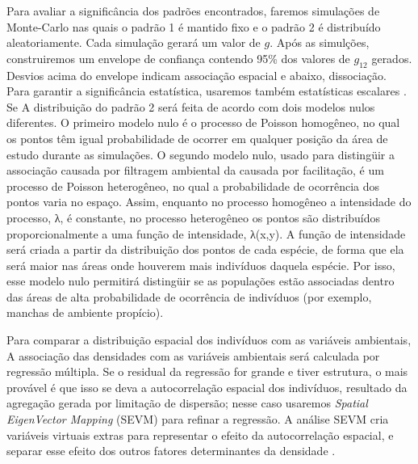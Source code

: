 \documentclass[twoside,12pt,a4paper]{report}
\begin{document}
Para avaliar a significância dos padrões encontrados, faremos simulações de Monte-Carlo nas
quais o padrão 1 é mantido fixo e o padrão 2 é distribuído aleatoriamente. 
Cada simulação gerará um valor de $g$. Após as simulções, construiremos um envelope de confiança contendo 95\% dos valores de
$g_{12}$ gerados. Desvios acima do envelope indicam associação espacial e abaixo,
dissociação. Para garantir a significância estatística, usaremos também estatísticas escalares
\citep{DiggleBook}. Se 
A distribuição do
padrão 2 será feita de acordo com dois modelos nulos diferentes. O primeiro modelo nulo é o
processo de Poisson homogêneo, no qual os pontos têm igual probabilidade de ocorrer em
qualquer posição da área de estudo durante as simulações. O segundo modelo nulo, usado para
distingüir a associação causada por filtragem ambiental da causada por facilitação, é um
processo de Poisson heterogêneo, no qual a probabilidade de ocorrência dos pontos varia no
espaço. Assim, enquanto no processo homogêneo a intensidade do processo, λ, é constante, no
processo heterogêneo os pontos são distribuídos proporcionalmente a uma função de
intensidade, λ(x,y). A função de intensidade será criada a partir da distribuição dos pontos
de cada espécie, de forma que ela será maior nas áreas onde houverem mais indivíduos daquela
espécie. Por isso, esse modelo nulo permitirá distingüir se as populações estão associadas
dentro das áreas de alta probabilidade de ocorrência de indivíduos (por exemplo, manchas de
ambiente propício).

Para comparar a distribuição espacial dos indivíduos com as variáveis ambientais, 
A associação das densidades com as variáveis ambientais será calculada por regressão
múltipla. Se o residual da regressão for grande e tiver estrutura, o mais provável é que isso
se deva a autocorrelação espacial dos indivíduos, resultado da agregação gerada por limitação
de dispersão; nesse caso usaremos {\em Spatial
EigenVector Mapping} (SEVM) para refinar a regressão. A análise SEVM cria variáveis virtuais
extras para representar o efeito da autocorrelação espacial, e separar esse efeito dos outros
fatores determinantes da densidade \citep{refsDiniz,Dormann2007methods}.
\end{document}
